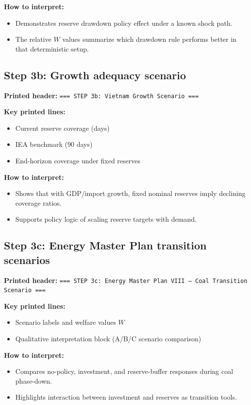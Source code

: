 \documentclass[11pt]{article}
\begin{document}
\textbf{How to interpret:}
\begin{itemize}
\item Demonstrates reserve drawdown policy effect under a known shock path.
\item The relative $W$ values summarize which drawdown rule performs better in that deterministic setup.
\end{itemize}

\subsection*{Step 3b: Growth adequacy scenario}
\textbf{Printed header:} \texttt{=== STEP 3b: Vietnam Growth Scenario ===}

\textbf{Key printed lines:}
\begin{itemize}
\item Current reserve coverage (days)
\item IEA benchmark (90 days)
\item End-horizon coverage under fixed reserves
\end{itemize}

\textbf{How to interpret:}
\begin{itemize}
\item Shows that with GDP/import growth, fixed nominal reserves imply declining coverage ratios.
\item Supports policy logic of scaling reserve targets with demand.
\end{itemize}

\subsection*{Step 3c: Energy Master Plan transition scenarios}
\textbf{Printed header:} \texttt{=== STEP 3c: Energy Master Plan VIII --- Coal Transition Scenario ===}

\textbf{Key printed lines:}
\begin{itemize}
\item Scenario labels and welfare values $W$
\item Qualitative interpretation block (A/B/C scenario comparison)
\end{itemize}

\textbf{How to interpret:}
\begin{itemize}
\item Compares no-policy, investment, and reserve-buffer responses during coal phase-down.
\item Highlights interaction between investment and reserves as transition tools.
\end{itemize}
\end{document}
